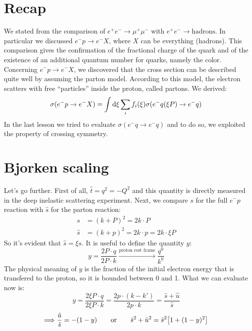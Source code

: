 \documentclass[../../main/main.tex]{subfiles}
\begin{document}

\section{Recap}
We stated from the comparison of \( e^+e^- \longrightarrow \mu^+\mu^- \) with \( e^+e^- \longrightarrow \text{hadrons} \). In particular we discussed \( e^-p \longrightarrow e^-X \), where \( X \) can be everything (hadrons). This comparison gives the confirmation of the fractional charge of the quark and of the existence of an additional quantum number for quarks, namely the color.
Concerning \( e^-p \longrightarrow e^-X \), we discovered that the cross section can be described quite well by assuming the parton model. According to this model, the electron scatters with free ``particles'' inside the proton, called partons. We derived:
\begin{equation}
	\sigma(e^-p \rightarrow e^-X)
	=
	\int \mathrm{d}{\xi} \sum_{i} f_i(\xi) \sigma(e^-q(\xi P) \rightarrow e^-q)
	\label{eq:}
\end{equation}
In the last lesson we tried to evaluate \( \sigma(e^-q \rightarrow e^-q) \) and to do so, we exploited the property of crossing symmetry.





\section{Bjorken scaling}
Let's go further. First of all, \( \hat{t} = q^2 = - Q^2 \) and this quantity is directly measured in the deep inelastic scattering experiment. Next, we compare \( s \) for the full \( e^-p \) reaction with \( \hat{s} \) for the parton reaction:
\begin{align}
	s 		&= (k + P)^2 = 2 k \cdot P	\label{eq:L09_DISS}	\\
	\hat{s}	&= (k + p)^2 = 2 k \cdot p = 2 k \cdot \xi P	\label{eq:L09_DISSH}
\end{align}
So it's evident that \( \hat{s} = \xi s \). It is useful to define the quantity \( y \):
\begin{equation}
	y
	=
	\frac{2P \cdot q}{2P \cdot k}
	\xrightarrow{\text{proton rest frame}}
	\frac{q^0}{k^0}
	\label{eq:}
\end{equation}
The physical meaning of \( y \) is the fraction of the initial electron energy that is transfered to the proton, so it is bounded between 0 and 1. What we can evaluate now is:
\begin{equation}
	y
	=
	\frac{2 \xi P \cdot q}{2 \xi P \cdot k}
	=
	\frac{2p \cdot (k - k')}{2p \cdot k}
	=
	\frac{\hat{s} + \hat{u}}{\hat{s}}
	\label{eq:}
\end{equation}
\begin{equation}
	\Longrightarrow
	\frac{\hat{u}}{\hat{s}} = -(1-y)
	\qquad \text{or} \qquad
	\hat{s}^2 + \hat{u}^2 = \hat{s}^2 \qty[1 + (1-y)^2]
	\label{eq:}
\end{equation}
\end{document}
